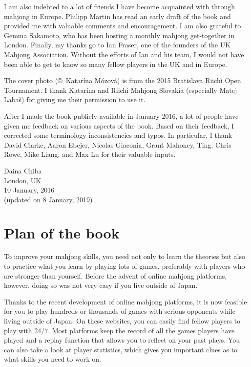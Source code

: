 \bigskip
I am also indebted to a lot of friends I have become acquainted with through mahjong in Europe. Philipp Martin has read an early draft of the book and provided me with valuable comments and encouragement. I am also grateful to Gemma Sakamoto, who has been hosting a monthly mahjong get-together in London. 
Finally, my thanks go to Ian Fraser, one of the founders of the UK Mahjong Association. 
Without the efforts of Ian and his team, I would not have been able to get to know so many fellow players in the UK and in Europe.

\bigskip
The cover photo (\copyright~Katar\'{i}na M\'{o}zov\'{a}) is from the 2015 Bratislava Riichi Open Tournament. I thank Katar\'{i}na and Riichi Mahjong Slovakia (especially Matej Laba\v{s}) for giving me their permission to use it.

\bigskip
After I made the book publicly available in January 2016, a lot of people have given me feedback on various aspects of the book. Based on their feedback, I corrected some terminology inconsistencies and typos. In particular, I thank David Clarke, Aaron Ebejer, Nicolas Giaconia, Grant Mahoney, Ting, Chris Rowe, Mike Liang, and Max Lu for their valuable inputs.

\vfill

\hfill Daina Chiba\\
\hfill London, UK\\
\hfill 10 January, 2016\\
\hfill (updated on 8 January, 2019)

\section*{Plan of the book}

To improve your mahjong skills, you need not only to learn the theories but also to practice what you learn by playing lots of games, preferably with players who are stronger than yourself. Before the advent of online mahjong platforms, however, doing so was not very easy if you live outside of Japan. 

\bigskip
Thanks to the recent development of online mahjong platforms, it is now feasible for you to play hundreds or thousands of games with serious opponents while living outside of Japan. On these websites, you can easily find fellow players to play with 24/7. Most platforms keep the record of all the games players have played and a replay function that allows you to reflect on your past plays. You can also take a look at player statistics, which gives you important clues as to what skills you need to work on.  


